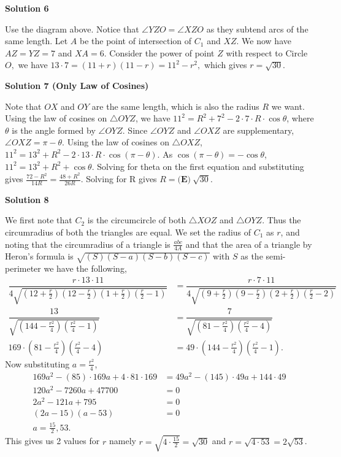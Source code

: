 \begin{enumerate}
\textbf{Solution 6}

Use the diagram above. Notice that $\angle YZO=\angle XZO$ as they subtend arcs of the same length. Let $A$ be the point of intersection of $C_1$ and $XZ$. We now have $AZ=YZ=7$ and $XA=6$. Consider the power of point $Z$ with respect to Circle $O,$ we have $13\cdot 7 = (11 + r)(11 - r) = 11^2 - r^2,$ which gives $r=\boxed{\sqrt{30}}.$




\textbf{Solution 7 (Only Law of Cosines)}

Note that $OX$ and $OY$ are the same length, which is also the radius $R$ we want. Using the law of cosines on $\triangle OYZ$, we have $11^2=R^2+7^2-2\cdot 7 \cdot R \cdot \cos\theta$, where $\theta$ is the angle formed by $\angle{OYZ}$. Since $\angle{OYZ}$ and $\angle{OXZ}$ are supplementary, $\angle{OXZ}=\pi-\theta$. Using the law of cosines on $\triangle OXZ$, $11^2=13^2+R^2-2 \cdot 13 \cdot R \cdot \cos(\pi-\theta)$. As $\cos(\pi-\theta)=-\cos\theta$, $11^2=13^2+R^2+\cos\theta$. Solving for theta on the first equation and substituting gives $\frac{72-R^2}{14R}=\frac{48+R^2}{26R}$. Solving for R gives $R=\textbf{(E)}\ \boxed{\sqrt{30}}$.

 



\textbf{Solution 8}

We first note that $C_2$ is the circumcircle of both $\triangle XOZ$ and $\triangle OYZ$. Thus the circumradius of both the triangles are equal. We set the radius of $C_1$ as $r$, and noting that the circumradius of a triangle is $\frac{abc}{4A}$ and that the area of a triangle by Heron's formula is $\sqrt{(S)(S-a)(S-b)(S-c)}$ with $S$ as the semi-perimeter we have the following, 
 \begin{align*}\dfrac{r \cdot 13 \cdot 11}{4\sqrt{(12 + \frac{r}{2})(12 - \frac{r}{2})(1 + \frac{r}{2})(\frac{r}{2} - 1)}} &= \dfrac{r \cdot 7 \cdot 11}{4\sqrt{(9 + \frac{r}{2})(9 - \frac{r}{2})(2 + \frac{r}{2})(\frac{r}{2} - 2)}} \\ \dfrac{13}{\sqrt{(144- \frac{r^2}{4})(\frac{r^2}{4} - 1)}} &= \dfrac{7}{\sqrt{(81- \frac{r^2}{4})(\frac{r^2}{4} - 4)}} \\ 169 \cdot (81 - \frac{r^2}{4})(\frac{r^2}{4} - 4) &= 49 \cdot (144 - \frac{r^2}{4})(\frac{r^2}{4} - 1) .\end{align*}
Now substituting $a = \frac{r^2}{4}$, 
 \begin{align*}169a^2 - (85) \cdot 169 a + 4 \cdot 81 \cdot 169 &= 49a^2 - (145) \cdot 49 a + 144 \cdot 49 \\ 120a^2 - 7260a + 47700 &= 0 \\ 2a^2 - 121a + 795 &= 0 \\ (2a-15)(a-53) &= 0 \\ a = \frac{15}{2}, 53.\end{align*}
This gives us 2 values for $r$ namely $r = \sqrt{4 \cdot \frac{15}{2}} = \sqrt{30}$ and $r = \sqrt{4 \cdot 53} = 2\sqrt{53}$.


\end{enumerate}
